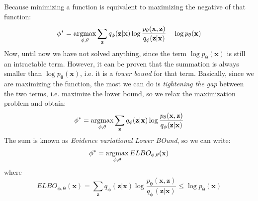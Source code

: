 Because minimizing a function is equivalent to maximizing the negative of that function:
\begin{equation}
	\mathbf{\phi}^* = \operatorname*{\operatorname{argmax}}_{\mathbf{\phi}, \mathbf{\theta}} \sum_{\mathbf{z}} q_\mathbf{\phi}(\mathbf{z} | \mathbf{x}) \log \frac{p_\mathbf{\theta}(\mathbf{x}, \mathbf{z})}{q_\mathbf{\phi}(\mathbf{z} | \mathbf{x})} - \log p_\mathbf{\theta}(\mathbf{x})
\end{equation}
Now, until now we have not solved anything, since the term $ \log p_\mathbf{\theta}(\mathbf{x})$ is still an intractable term. However, it can be proven that the summation is always smaller than $\log p_\mathbf{\theta}(\mathbf{x})$, i.e. it is a \emph{lower bound} for that term. Basically, since we are maximizing the function, the most we can do is \emph{tightening the gap} between the two terms, i.e. maximize the lower bound, so we relax the maximization problem and obtain:
\begin{equation}
	\mathbf{\phi}^* = \operatorname*{\operatorname{argmax}}_{\mathbf{\phi}, \mathbf{\theta}} \sum_{\mathbf{z}} q_\mathbf{\phi}(\mathbf{z} | \mathbf{x}) \log \frac{p_\mathbf{\theta}(\mathbf{x}, \mathbf{z})}{q_\mathbf{\phi}(\mathbf{z} | \mathbf{x})}
\end{equation}
The sum is known as \emph{Evidence variational Lower BOund}, so we can write:
\begin{equation}
	\mathbf{\phi}^* = \operatorname*{\operatorname{argmax}}_{\mathbf{\phi}, \mathbf{\theta}} ELBO_{\mathbf{\phi}, \mathbf{\theta}}(\mathbf{x})
\end{equation}
where 
\begin{equation}
	ELBO_{\mathbf{\phi}, \mathbf{\theta}}(\mathbf{x}) = \sum_{\mathbf{z}} q_\mathbf{\phi}(\mathbf{z} | \mathbf{x}) \log \frac{p_\mathbf{\theta}(\mathbf{x}, \mathbf{z})}{q_\mathbf{\phi}(\mathbf{z} | \mathbf{x})} \leq \log p_\mathbf{\theta}(\mathbf{x})
\end{equation}

